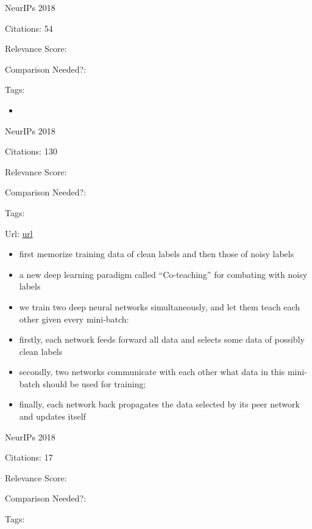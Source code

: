 \documentclass[11pt]{article}
\begin{document}
\noindent NeurIPs 2018

\noindent Citations: 54

\noindent Relevance Score:

\noindent Comparison Needed?: 

\noindent Tags: 

\begin{itemize}
  \item 
\end{itemize}

\vspace{2cm}

\noindent NeurIPs 2018

\noindent Citations: 130

\noindent Relevance Score:

\noindent Comparison Needed?: 

\noindent Tags:

\noindent Url: \href{https://arxiv.org/pdf/1804.06872.pdf}{url}

\begin{itemize}
\item first memorize training data of clean labels and then those of noisy labels
\item a new deep learning paradigm called “Co-teaching” for combating with noisy labels
\item we train two deep neural networks simultaneously, and let them teach each other given every mini-batch:
\item firstly, each network feeds forward all data and selects some data of possibly clean labels
\item  secondly, two networks communicate with each other what data in this mini-batch should be used for training;
\item finally, each network back propagates the data selected by its peer network and updates itself
\end{itemize}

\vspace{2cm}

\noindent NeurIPs 2018

\noindent Citations: 17

\noindent Relevance Score:

\noindent Comparison Needed?: 

\noindent Tags:
\end{document}
